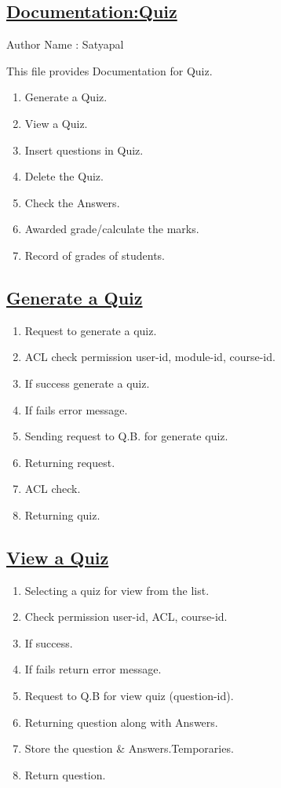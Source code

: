 \documentclass{article}
\begin{document}
\begin{center}
\section*{\underline{Documentation:Quiz}}
                         Author Name : Satyapal 
\end{center}
This file provides Documentation for Quiz.
\begin{enumerate}
\item Generate a Quiz. 
\item View a Quiz.
\item Insert questions in Quiz.
\item Delete the Quiz.
\item Check the Answers.
\item Awarded grade/calculate the marks.
\item Record of grades of students.
\end{enumerate}
\subsection*{\underline{Generate a Quiz}}
\begin{enumerate}
\item  Request to generate a quiz.
\item  ACL check permission user-id, module-id, course-id.
\item  If success generate a quiz.
\item  If fails error message.
\item  Sending request to Q.B. for generate quiz.
\item  Returning request.
\item  ACL check.
\item  Returning quiz.
\begin{center}

\end{center}
\end{enumerate}
\subsection*{\underline{View a Quiz}}
\begin{enumerate}
\item Selecting a quiz for view from the list.
\item Check permission user-id, ACL, course-id.
\item If success.
\item If fails return error message.
\item Request to Q.B for view quiz (question-id).
\item Returning question along with Answers.
\item Store the question \& Answers.Temporaries.
\item Return question.
\end{enumerate}
\end{document}
